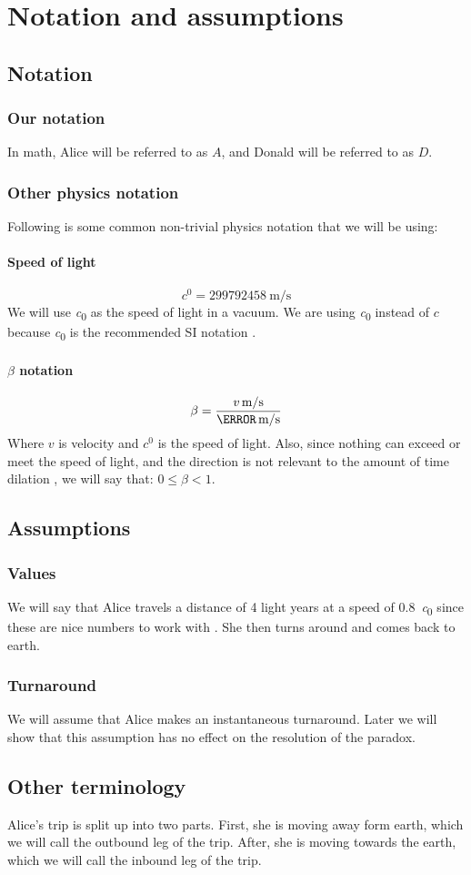 	\section{Notation and assumptions}
		\subsection{Notation}\label{subsec:notation}
			\subsubsection{Our notation}
				In math, Alice will be referred to as $A$, and Donald will be referred to as $D$.
			\subsubsection{Other physics notation}
			Following is some common non-trivial physics notation that we will be using:
			\paragraph{Speed of light}
				\[\si{\clight} = \SI{299792458}{\metre/\second}\]
				We will use \si{\clight} as the speed of light in a vacuum. We are using \si{\clight} instead of $c$ because \si{\clight} is the recommended SI notation \autocite{siunits}.
			\paragraph{$\beta$ notation}
				\[\beta = \frac{\varSI{v}{\metre/\second}}{\varSI{\clight}{\metre/\second}}\]
				Where $v$ is velocity and $\si{\clight}$ is the speed of light. Also, since nothing can exceed or meet the speed of light, and the direction is not relevant to the amount of time dilation \autocite{textbook,einstein1916}, we will say that: $0 \leq \beta < 1$.
		\subsection{Assumptions}\label{subsec:twinAssumptions}
			\subsubsection{Values}
				We will say that Alice travels a distance of 4 light years at a speed of \SI{0.8}{\clight} since these are nice numbers to work with \autocite[\pno~35]{kogut2012introduction}.
				She then turns around and comes back to earth.
			\subsubsection{Turnaround}
				We will assume that Alice makes an instantaneous turnaround.
				Later we will show that this assumption has no effect on the resolution of the paradox.
		\subsection{Other terminology}
			Alice's trip is split up into two parts.
			First, she is moving away form earth, which we will call the outbound leg of the trip.
			After, she is moving towards the earth, which we will call the inbound leg of the trip.
